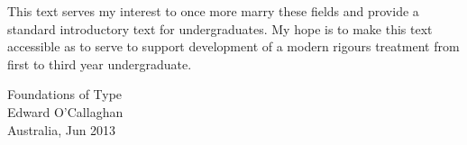 This text serves my interest to once more marry these fields and provide a
standard introductory text for undergraduates. My hope is to make this text
accessible as to serve to support development of a modern rigours treatment
from first to third year undergraduate.


\bigskip

\begin{flushright}
Foundations of Type\\
Edward O'Callaghan\\
Australia, Jun 2013
\end{flushright}
